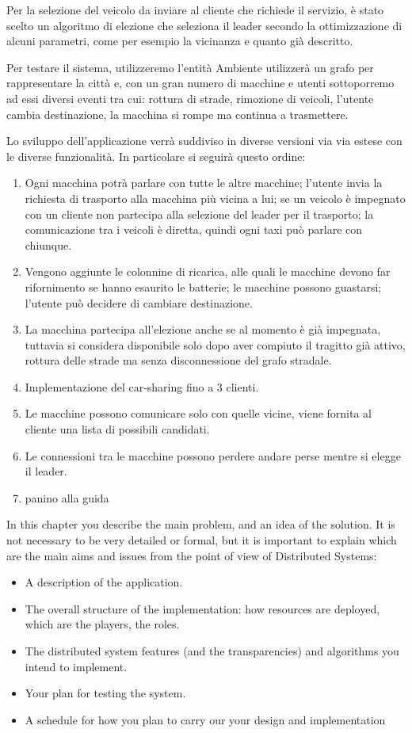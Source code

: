 Per la selezione del veicolo da inviare al cliente che richiede il servizio, è stato scelto un algoritmo di elezione che seleziona il leader secondo la ottimizzazione di alcuni parametri, come per esempio la vicinanza e quanto già descritto.

Per testare il sistema, utilizzeremo l'entità Ambiente utilizzerà un grafo per rappresentare la città e, con un gran numero di macchine e utenti sottoporremo ad essi diversi eventi tra cui: rottura di strade, rimozione di veicoli, l'utente cambia destinazione, la macchina si rompe ma continua a trasmettere.

Lo sviluppo dell'applicazione verrà suddiviso in diverse versioni via via estese con le diverse funzionalità. In particolare si seguirà questo ordine:
\begin{enumerate}
	\item Ogni macchina potrà parlare con tutte le altre macchine; l'utente invia la richiesta di trasporto alla macchina più vicina a lui; se un veicolo è impegnato con un cliente non partecipa alla selezione del leader per il trasporto; la comunicazione tra i veicoli è diretta, quindi ogni taxi può parlare con chiunque.
	\item Vengono aggiunte le colonnine di ricarica, alle quali le macchine devono far rifornimento se hanno esaurito le batterie; le macchine possono guastarsi; l'utente può decidere di cambiare destinazione.
	\item La macchina partecipa all'elezione anche se al momento è già impegnata, tuttavia si considera disponibile solo dopo aver compiuto il tragitto già attivo, rottura delle strade ma senza disconnessione del grafo stradale.
	\item Implementazione del car-sharing fino a 3 clienti.
	\item Le macchine possono comunicare solo con quelle vicine, viene fornita al cliente una lista di possibili candidati.
	\item Le connessioni tra le macchine possono perdere andare perse mentre si elegge il leader.
	\item panino alla guida
\end{enumerate}

In this chapter you describe the main problem, and an idea of the solution. It is not necessary to be very detailed or formal, but it is important to explain which are the main aims and issues from the point of view of Distributed Systems:


\begin{itemize}
	\item A description of the application.
	\item The overall structure of the implementation: how resources are deployed, which are the players, the roles.
	\item The distributed system features (and the transparencies) and algorithms you intend to implement.
	\item Your plan for testing the system.
	\item A schedule for how you plan to carry our your design and implementation
\end{itemize}
